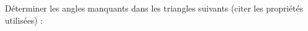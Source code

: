 
\begin{exercice}\label{exo2smath-0254}

    Déterminer les angles manquants dans les triangles suivants (citer les propriétés utilisées) :

   
   \hspace{2cm}
   


\end{exercice}
